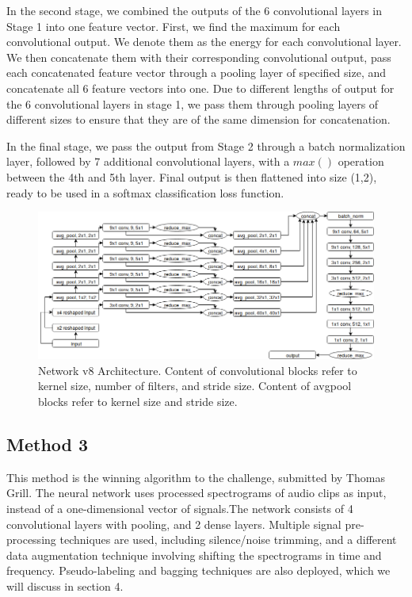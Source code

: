 \documentclass[10pt,twocolumn,letterpaper]{article}
\begin{document}
In the second stage, we combined the outputs of the 6 convolutional layers
in Stage 1 into one feature vector. First, we find the maximum for each
convolutional output. We denote them as the energy for each convolutional
layer. We then concatenate them with their corresponding convolutional
output, pass each concatenated feature vector through a pooling layer of
specified size, and concatenate all 6 feature vectors into one. Due to
different lengths of output for the 6 convolutional layers in stage 1, we
pass them through pooling layers of different sizes to ensure that they are
of the same dimension for concatenation.

In the final stage, we pass the output from Stage 2 through a batch
normalization layer, followed by 7 additional convolutional layers, with a
\(max()\) operation between the 4th and 5th layer. Final output is then
flattened into size (1,2), ready to be used in a softmax classification
loss function.

\begin{figure}
	\centering
	\includegraphics[width=\textwidth]{v8_diagram}
	\caption{Network v8 Architecture. Content of convolutional blocks refer
	to kernel size, number of filters, and stride size. Content of avgpool
	blocks refer to kernel size and stride size.}
\end{figure}

\subsection{Method 3}


This method is the winning algorithm to the challenge, submitted by Thomas
Grill. The neural network uses processed spectrograms of audio clips as
input, instead of a one-dimensional vector of signals.The network consists
of 4 convolutional layers with pooling, and 2 dense layers. Multiple signal
pre-processing techniques are used, including silence/noise trimming, and a
different data augmentation technique involving shifting the spectrograms
in time and frequency.  Pseudo-labeling and bagging techniques are also
deployed, which we will discuss in section 4.
\end{document}
